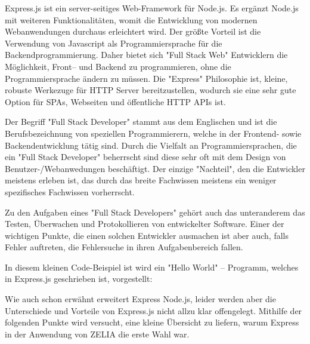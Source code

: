 
Express.js ist ein server-seitiges Web-Framework für Node.js. Es ergänzt Node.js mit weiteren Funktionalitäten, womit die Entwicklung von modernen Webanwendungen durchaus erleichtert wird. Der größte Vorteil ist die Verwendung von Javascript als Programmiersprache für die Backendprogrammierung. Daher bietet sich "Full Stack Web" Entwicklern die Möglichkeit, Front– und Backend zu programmieren, ohne die Programmiersprache ändern zu müssen. Die "Express" Philosophie ist, kleine, robuste Werkezuge für HTTP Server bereitzustellen, wodurch sie eine sehr gute Option für SPAs, Webseiten und öffentliche HTTP APIs ist. \cite{Express}

Der Begriff "Full Stack Developer" stammt aus dem Englischen und ist die Berufsbezeichnung von speziellen Programmierern, welche in der Frontend- sowie Backendentwicklung tätig sind. Durch die Vielfalt an Programmiersprachen, die ein "Full Stack Developer" beherrscht sind diese sehr oft mit dem Design von Benutzer-/Webanwedungen beschäftigt. Der einzige "Nachteil", den die Entwickler meistens erleben ist, das durch das breite Fachwissen meistens ein weniger spezifisches Fachwissen vorherrscht. 

Zu den Aufgaben eines "Full Stack Developers" gehört auch das unteranderem das Testen, Überwachen und Protokollieren von entwickelter Software. Einer der wichtigen Punkte, die einen solchen Entwickler ausmachen ist aber auch, falls Fehler auftreten, die Fehlersuche in ihren Aufgabenbereich fallen. \cite{FullStack}

\pagebreak
{}

In diesem kleinen Code-Beispiel ist wird ein "Hello World" – Programm, welches in Express.js geschrieben ist, vorgestellt:


\cite{Express}


Wie auch schon erwähnt erweitert Express Node.js, leider werden aber die Unterschiede und Vorteile von Express.js nicht allzu klar offengelegt. Mithilfe der folgenden Punkte wird versucht, eine kleine Übersicht zu liefern, warum Express in der Anwendung von ZELIA die erste Wahl war.

